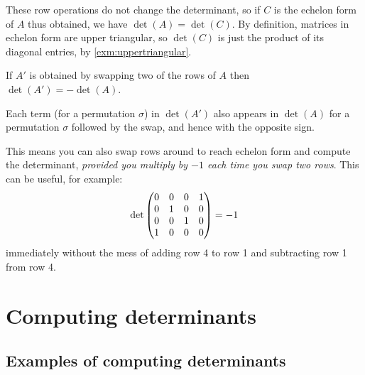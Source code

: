 \documentclass{article}
\begin{document}
\begin{Proof}
These row operations do not change the determinant, so if \(C\) is
the echelon form of \(A\) thus obtained, we have
\(\det(A)=\det(C)\). By definition, matrices in echelon form are
upper triangular, so \(\det(C)\) is just the product of its diagonal
entries, by \cref{exm:uppertriangular}. \qedhere


\end{Proof}
\begin{Lemma}
If \(A'\) is obtained by swapping two of the rows of \(A\) then
\(\det(A')=-\det(A)\).
\end{Lemma}
\begin{Proof}
Each term (for a permutation \(\sigma\)) in \(\det(A')\) also
appears in \(\det(A)\) for a permutation \(\sigma\) followed by the
swap, and hence with the opposite sign. \qedhere


\end{Proof}
\begin{Remark}
This means you can also swap rows around to reach echelon form and
compute the determinant, {\em provided you multiply by \(-1\) each
time you swap two rows}. This can be useful, for example: \[\det\begin{pmatrix}
0 & 0 & 0 & 1 \\ 0 & 1 & 0 & 0 \\ 0 & 0 & 1 & 0 \\ 1 & 0 & 0 &
0\end{pmatrix}=-1\] immediately without the mess of adding row 4 to row 1 and
subtracting row 1 from row 4.


\end{Remark}
\clearpage
\section{Computing determinants}
\subsection{Examples of computing determinants}
\end{document}
